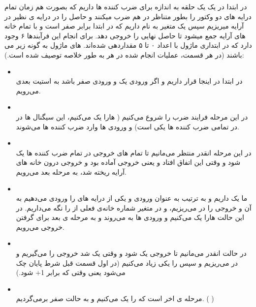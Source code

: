 \documentclass[12pt,titlepage,a4page , tikz , multi,table , svgnames,xcdraw]{article}
\begin{document}
در ابتدا در یک
یک حلقه به اندازه 
برای ضرب کننده ها
داریم که بصورت هم زمان تمام درایه های دو وکتور را بطور متناظر در هم ضرب میکنند و حاصل را در درایه ی نظیر در آرایه 
میریزیم سپس یک متغیر به نام
داریم که در ابتدا برابر صفر است و با تمام خانه های آرایه
جمع میشود تا حاصل نهایی را خروجی دهد.
برای انجام این فرآبند‌ها ۶ 
وجود دارد که در ابتداری ماژول با اعداد ۰ تا ۵ مقداردهی شده‌اند.
 های ماژول به گونه زیر می باشند (در هر قسمت، عملیات انجام شده در هر 
 به طور خلاصه توصیف شده است.): 
 
 
\begin{itemize}

\item {} \\
در ابتدا در اینجا قرار داریم و اگر ورودی 
یک و ورودی 
صفر باشد به استیت بعدی می‌رویم.

\item {} \\
در این مرحله فرایند ضرب را شروع می‌کنیم
( 
هارا یک می‌کنیم، این سیگنال ها در در تمامی ضرب کننده ها یکی است) و ورودی ها وارد ضرب کننده ها می‌شوند.

\item {} \\
در این مرحله انقدر منتظر می‌مانیم تا تمام 
های خروجی در تمام ضرب کننده ها یک شود و وقتی این اتفاق افتاد و یعنی خروجی آماده بود و خروجی درون خانه های آرایه 
ریخته شد، به مرحله بعد می‌رویم.

\item {} \\
ما یک 
داریم و به ترتیب به عنوان ورودی 
و یکی از درایه های 
را ورودی می‌دهیم به آن و خروجی را در 
می‌ریزیم، و در متغیر 
شماره خانه‌ی فعلی از 
را نگه می‌داریم. در این حالت
هارا یک می‌کنیم و ورودی ها به 
می‌روند و به مرحله ی بعد برای گرفتن خروجی می‌رویم.

\item {} \\
در حالت انقدر می‌مانیم تا 
خروجی یک شود و وقتی یک شد خروجی را می‌گیریم و در 
می‌ریزیم و سپس
را یکی زیاد می‌کنیم (در اول قسمت قبل شرط پایان چک می‌شود یعنی وقتی که 
برابر 1+
شود.)

\item {} \\
مرحله ی اخر است که 
را یک می‌کنیم و به حالت صفر برمی‌گردیم.
(
)

\end{itemize}
\end{document}
